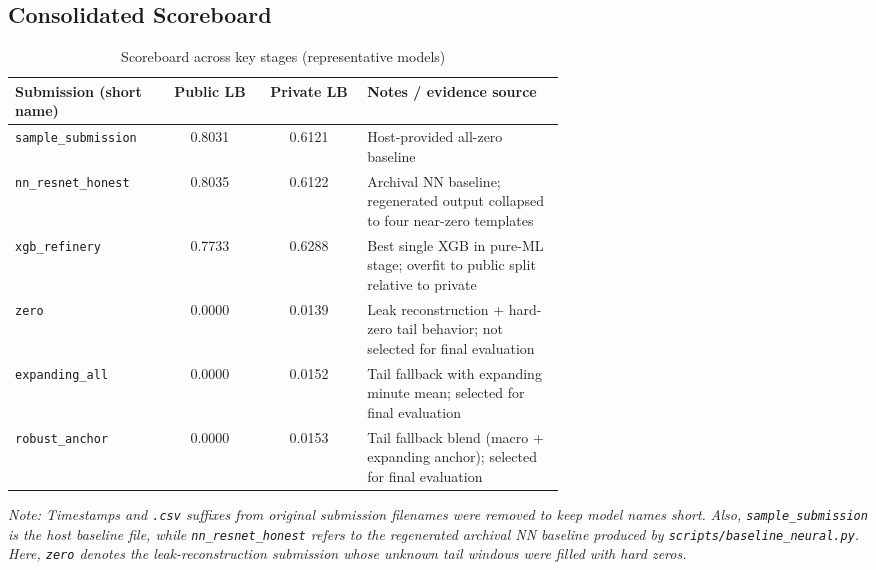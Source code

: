 \subsection{Consolidated Scoreboard}
\begin{table}[htbp]
\centering
\scriptsize
\caption{Scoreboard across key stages (representative models)}
\begin{tabular}{p{0.28\linewidth} c c p{0.36\linewidth}}
\toprule
Submission (short name) & Public LB & Private LB & Notes / evidence source \\
\midrule
\texttt{sample\_submission} & 0.8031 & 0.6121 & Host-provided all-zero baseline \\
\texttt{nn\_resnet\_honest} & 0.8035 & 0.6122 & Archival NN baseline; regenerated output collapsed to four near-zero templates \\
\texttt{xgb\_refinery} & 0.7733 & 0.6288 & Best single XGB in pure-ML stage; overfit to public split relative to private \\
\texttt{zero} & 0.0000 & 0.0139 & Leak reconstruction + hard-zero tail behavior; not selected for final evaluation \\
\texttt{expanding\_all} & 0.0000 & 0.0152 & Tail fallback with expanding minute mean; selected for final evaluation \\
\texttt{robust\_anchor} & 0.0000 & 0.0153 & Tail fallback blend (macro + expanding anchor); selected for final evaluation \\
\bottomrule
\end{tabular}
\end{table}
\noindent\scriptsize
\textit{Note: Timestamps and \texttt{.csv} suffixes from original submission filenames were removed to keep model names short.}
\textit{Also, \texttt{sample\_submission} is the host baseline file, while \texttt{nn\_resnet\_honest} refers to the regenerated archival NN baseline produced by \texttt{scripts/baseline\_neural.py}. Here, \texttt{zero} denotes the leak-reconstruction submission whose unknown tail windows were filled with hard zeros.}
\normalsize

